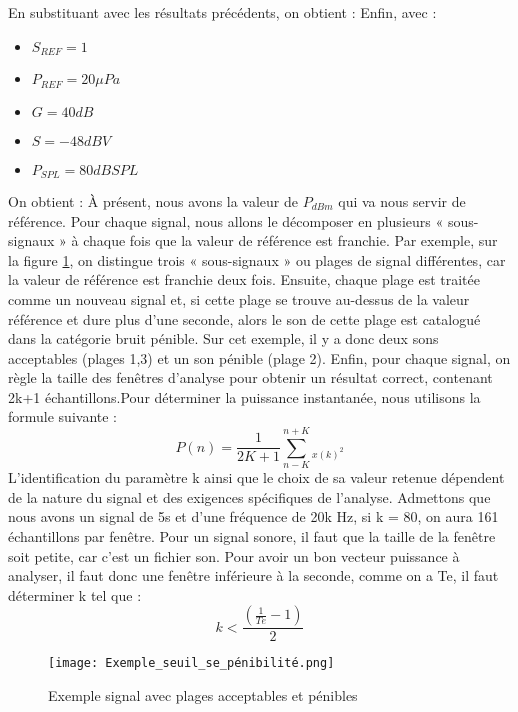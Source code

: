 En substituant avec les résultats précédents, on obtient :
Enfin, avec : \begin{itemize}
    \item $S_{REF} = 1$
    \item $P_{REF} = 20 \mu Pa$
    \item $G = 40 dB$
    \item $S = -48 dBV$
    \item $P_{SPL} = 80 dB SPL$
\end{itemize} 
On obtient : 
À présent, nous avons la valeur de $P_{dBm}$ qui va nous servir de référence. Pour chaque signal, nous allons le décomposer en plusieurs « sous-signaux » à chaque fois que la valeur de référence est franchie. 
Par exemple, sur la figure \ref{Fig.1.2}, on distingue trois « sous-signaux » ou plages de signal différentes, car la valeur de référence est franchie deux fois. Ensuite, chaque plage est traitée comme un nouveau signal et, si cette plage se trouve au-dessus de la valeur référence et dure plus d’une seconde, alors le son de cette plage est catalogué dans la catégorie bruit pénible. Sur cet exemple, il y a donc deux sons acceptables (plages 1,3) et un son pénible (plage 2).
Enfin, pour chaque signal, on règle la taille des fenêtres d’analyse pour obtenir un résultat correct, contenant 2k+1 échantillons.Pour déterminer la puissance instantanée, nous utilisons la formule suivante :
\begin{equation}
    P(n) = \frac{1}{2K+1}\sum_{n-K}^{n+K}_{x(k)^2}
\end{equation}
L'identification du paramètre k ainsi que le choix de sa valeur retenue dépendent de la nature du signal et des exigences spécifiques de l'analyse. Admettons que nous avons un signal de 5s et d'une fréquence de 20k Hz, si k = 80, on aura 161 échantillons par fenêtre. Pour un signal sonore, il faut que la taille de la fenêtre soit petite, car c'est un fichier son. Pour avoir un bon vecteur puissance à analyser, il faut donc une fenêtre inférieure à la seconde, comme on a Te, il faut déterminer k tel que :
\begin{equation}
    k < \frac{(\frac{1}{Te}-1)}{2}
\end{equation}
\begin{figure}[htb]
    \centering
    \texttt{[image: Exemple\_seuil\_se\_pénibilité.png]}
    \caption{Exemple signal avec plages acceptables et pénibles}
    \label{Fig.1.2}
\end{figure}


